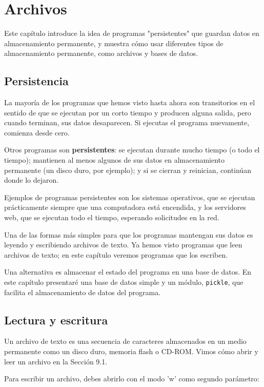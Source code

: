 
\chapter{Archivos}

Este capítulo introduce la idea de programas "persistentes" que guardan datos en almacenamiento permanente, y muestra cómo usar diferentes tipos de almacenamiento permanente, como archivos y bases de datos.

\section{Persistencia}

La mayoría de los programas que hemos visto hasta ahora son transitorios en el sentido de que se ejecutan por un corto tiempo y producen alguna salida, pero cuando terminan, sus datos desaparecen. Si ejecutas el programa nuevamente, comienza desde cero.

Otros programas son \textbf{persistentes}: se ejecutan durante mucho tiempo (o todo el tiempo); mantienen al menos algunos de sus datos en almacenamiento permanente (un disco duro, por ejemplo); y si se cierran y reinician, continúan donde lo dejaron.

Ejemplos de programas persistentes son los sistemas operativos, que se ejecutan prácticamente siempre que una computadora está encendida, y los servidores web, que se ejecutan todo el tiempo, esperando solicitudes en la red.

Una de las formas más simples para que los programas mantengan sus datos es leyendo y escribiendo archivos de texto. Ya hemos visto programas que leen archivos de texto; en este capítulo veremos programas que los escriben.

Una alternativa es almacenar el estado del programa en una base de datos. En este capítulo presentaré una base de datos simple y un módulo, \texttt{pickle}, que facilita el almacenamiento de datos del programa.

\section{Lectura y escritura}

Un archivo de texto es una secuencia de caracteres almacenados en un medio permanente como un disco duro, memoria flash o CD-ROM. Vimos cómo abrir y leer un archivo en la Sección 9.1.

Para escribir un archivo, debes abrirlo con el modo 'w' como segundo parámetro:

